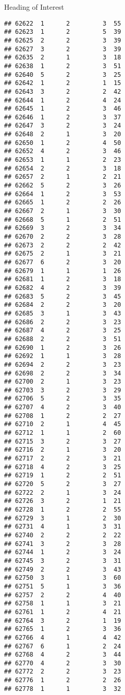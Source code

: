 \documentclass[
  ignorenonframetext,
]{beamer}
\begin{document}
\begin{frame}[fragile]{Heading of Interest}
\begin{verbatim}
## 62622  1      2         3  55
## 62623  1      2         5  39
## 62625  2      2         3  39
## 62627  3      2         3  39
## 62635  2      1         3  18
## 62638  1      2         3  51
## 62640  5      2         3  25
## 62642  1      2         1  15
## 62643  3      2         2  42
## 62644  1      2         4  24
## 62645  1      2         3  46
## 62646  1      2         3  37
## 62647  3      2         3  24
## 62648  2      1         3  20
## 62650  1      2         4  50
## 62652  4      2         3  46
## 62653  1      1         2  23
## 62654  2      2         3  18
## 62657  2      1         2  21
## 62662  5      2         3  26
## 62664  1      2         3  53
## 62665  1      2         2  26
## 62667  2      1         3  30
## 62668  5      1         2  51
## 62669  3      2         3  34
## 62670  2      2         3  28
## 62673  2      2         2  42
## 62675  2      1         3  21
## 62677  6      2         3  20
## 62679  1      1         1  26
## 62681  1      2         3  18
## 62682  4      2         3  39
## 62683  5      2         3  45
## 62684  2      2         3  20
## 62685  3      1         3  43
## 62686  2      2         3  23
## 62687  4      2         3  25
## 62688  2      2         3  51
## 62690  1      2         3  26
## 62692  1      1         3  28
## 62694  2      2         3  23
## 62698  2      2         3  34
## 62700  2      1         3  23
## 62703  3      2         3  29
## 62706  5      2         3  35
## 62707  4      2         3  40
## 62708  1      2         2  27
## 62710  2      1         4  45
## 62712  1      1         2  60
## 62715  3      2         3  27
## 62716  2      1         3  20
## 62717  2      2         3  21
## 62718  4      2         3  25
## 62719  1      2         2  51
## 62720  5      2         3  27
## 62722  2      1         3  24
## 62726  3      2         1  21
## 62728  1      2         2  55
## 62729  3      1         2  30
## 62731  4      1         3  31
## 62740  2      2         2  22
## 62741  3      2         3  28
## 62744  1      2         3  24
## 62745  3      2         3  31
## 62749  2      2         3  43
## 62750  3      1         3  60
## 62751  5      1         3  36
## 62757  2      2         4  40
## 62758  1      1         3  21
## 62761  1      2         4  21
## 62764  3      2         1  19
## 62765  1      2         3  36
## 62766  4      1         4  42
## 62767  6      1         2  24
## 62768  4      2         3  44
## 62770  4      2         3  30
## 62772  2      2         3  23
## 62776  1      2         2  26
## 62778  1      1         3  32

\end{verbatim}
\end{frame}
\end{document}
